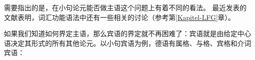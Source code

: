
需要指出的是，在小句论元能否做主语这个问题上有着不同的看法。
最近发表的文献表明，词汇功能语法\indexlfg 中还有一些相关的讨论（参考第\ref{Kapitel-LFG}章）\citep*{DL2000a-u,Berman2003b-u,Berman2007a-u,AMM2005a-u,Forst2006a-u}。  

如果我们知道如何界定主语，那么宾语的界定就不再困难了：宾语就是由给定中心语决定其形式的所有其他论元。以小句宾语为例，德语有属格、与格、宾格和介词宾语：

